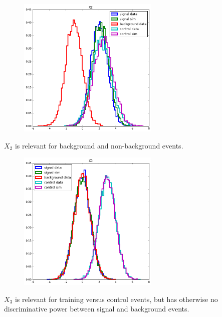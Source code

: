 \documentclass{beamer}
\begin{document}
\begin{frame}

\begin{figure}
\centering
\includegraphics[width=0.6\textwidth]{figures/x2.png}
\end{figure}

$X_2$ is {\color{blue} relevant} for  background and non-background events.

\end{frame}


\begin{frame}

\begin{figure}
\centering
\includegraphics[width=0.6\textwidth]{figures/x3.png}
\end{figure}

$X_3$ is relevant for training versus control events, but has otherwise no
discriminative power between signal and background events.

\end{frame}
\end{document}
